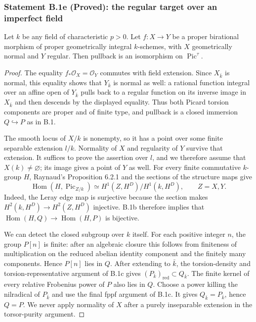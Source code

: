 \subsubsection*{Statement B.1e (Proved): the regular target over an imperfect field}
Let $k$ be any field of characteristic $p>0$.  Let $f:X\to Y$ be a
proper birational morphism of proper geometrically integral $k$-schemes,
with $X$ geometrically normal and $Y$ regular.  Then pullback is an
isomorphism on $\operatorname{Pic}^{\tau}$.
\begin{proof}
The equality $f_*\mathcal O_X=\mathcal O_Y$ commutes with field extension.
Since $X_{\bar k}$ is normal, this equality shows that $Y_{\bar k}$ is
normal as well: a rational function integral over an affine open of
$Y_{\bar k}$ pulls back to a regular function on its inverse image in
$X_{\bar k}$ and then descends by the displayed equality.  Thus both
Picard torsion components are proper and of finite type, and pullback
is a closed immersion $Q\hookrightarrow P$ as in B.1.

The smooth locus of $X/k$ is nonempty, so it has a point over some
finite separable extension $l/k$.  Normality of $X$ and regularity of
$Y$ survive that extension.  It suffices to prove the assertion over
$l$, and we therefore assume that $X(k)\ne\varnothing$; its image gives
a point of $Y$ as well.  For every finite commutative $k$-group $H$,
Raynaud's Proposition 6.2.1 and the sections of the structure maps give
\[
 \operatorname{Hom}(H,\operatorname{Pic}_{Z/k})
 \simeq H^1(Z,H^D)/H^1(k,H^D),\qquad Z=X,Y.
\]
Indeed, the Leray edge map is surjective because the section makes
$H^2(k,H^D)\to H^2(Z,H^D)$ injective.  B.1b therefore implies that
$\operatorname{Hom}(H,Q)\to\operatorname{Hom}(H,P)$ is bijective.

We can detect the closed subgroup over $k$ itself.  For each positive
integer $n$, the group $P[n]$ is finite: after an algebraic closure
this follows from finiteness of multiplication on the reduced abelian
identity component and the finitely many components.  Hence $P[n]$
lies in $Q$.  After extending to $\bar k$, the torsion-density and
torsion-representative argument of B.1c gives
$(P_{\bar k})_{\mathrm{red}}\subset Q_{\bar k}$.
The finite kernel of every relative Frobenius power of $P$ also lies
in $Q$.  Choose a power killing the nilradical of $P_{\bar k}$ and use
the final fppf argument of B.1c.  It gives $Q_{\bar k}=P_{\bar k}$,
hence $Q=P$.  We never apply normality of $X$ after a purely
inseparable extension in the torsor-purity argument.
\end{proof}


